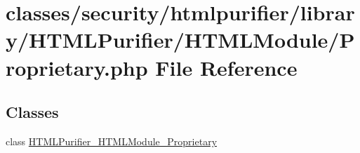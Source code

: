 \hypertarget{Proprietary_8php}{\section{classes/security/htmlpurifier/library/\+H\+T\+M\+L\+Purifier/\+H\+T\+M\+L\+Module/\+Proprietary.php File Reference}
\label{Proprietary_8php}
}
\subsection*{Classes}
\begin{DoxyCompactItemize}
\item 
class \hyperlink{classHTMLPurifier__HTMLModule__Proprietary}{H\+T\+M\+L\+Purifier\+\_\+\+H\+T\+M\+L\+Module\+\_\+\+Proprietary}
\end{DoxyCompactItemize}

